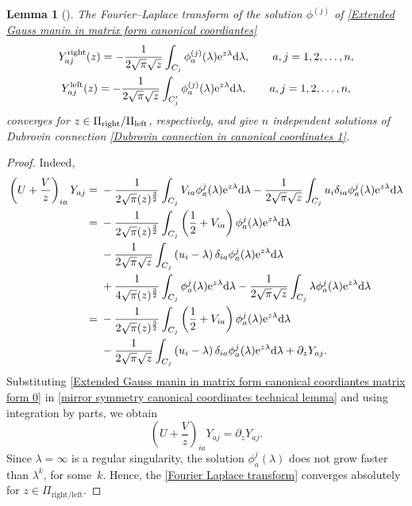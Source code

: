 \documentclass[11pt]{article}
\numberwithin{equation}{section}
\numberwithin{equation}{section}
\newtheorem{Lemma}[Theorem]{Lemma}
\begin{document}
 \begin{Lemma}[{\cite{B.Dubrovin3}}]\label{Main lemma Mirror symmetry 1}
 The Fourier--Laplace transform of the solution $\phi^{(j)}$ of \eqref{Extended Gauss manin in matrix form canonical coordiantes}
\begin{gather}
Y^{\rm right}_{aj}(z)=-\frac{1}{2\sqrt{\pi}\sqrt{z}}\int_{C_j}\phi_a^{(j)}(\lambda){\rm e}^{z\lambda}{\rm d}\lambda, \qquad a,j=1,2,\dots,n,\nonumber\\
Y^{\rm left}_{aj}(z)=-\frac{1}{2\sqrt{\pi}\sqrt{z}}\int_{C_j^{\prime}}\phi_a^{(j)}(\lambda){\rm e}^{z\lambda}{\rm d}\lambda, \qquad a,j=1,2,\dots,n,\label{Fourier Laplace transform}
\end{gather}
converges for $z \in \Pi_{\rm right}/\Pi_{\rm left}$, respectively, and give $n$ independent solutions of Dubrovin connection \eqref{Dubrovin connection in canonical coordinates 1}.
\end{Lemma}

\begin{proof}
 Indeed,
\begin{align}
\left(U+\frac{V}{z}\right)_{ia}Y_{aj}={}&-\frac{1}{2\sqrt{\pi}(z)^{\frac{3}{2}}}\int_{C_j}V_{ia}\phi_a^{j}(\lambda){\rm e}^{z\lambda}{\rm d}\lambda-\frac{1}{2\sqrt{\pi}\sqrt{z}}\int_{C_j}u_i\delta_{ia}\phi_a^{j}(\lambda){\rm e}^{z\lambda}{\rm d}\lambda\nonumber\\
={}&-\frac{1}{2\sqrt{\pi}(z)^{\frac{3}{2}}}\int_{C_j}\left(\frac{1}{2}+V_{ia}\right)\phi_a^{j}(\lambda){\rm e}^{z\lambda}{\rm d}\lambda\nonumber\\
&-\frac{1}{2\sqrt{\pi}\sqrt{z}}\int_{C_j}\left(u_i-\lambda\right)\delta_{ia}\phi_a^{j}(\lambda){\rm e}^{z\lambda}{\rm d}\lambda\nonumber\\
&+\frac{1}{4\sqrt{\pi}(z)^{\frac{3}{2}}}\int_{C_j}\phi_a^{j}(\lambda){\rm e}^{z\lambda}{\rm d}\lambda-\frac{1}{2\sqrt{\pi}\sqrt{z}}\int_{C_j}\lambda\phi_a^{j}(\lambda){\rm e}^{z\lambda}{\rm d}\lambda\nonumber\\
={}&-\frac{1}{2\sqrt{\pi}(z)^{\frac{3}{2}}}\int_{C_j}\left(\frac{1}{2}+V_{ia}\right)\phi_a^{j}(\lambda){\rm e}^{z\lambda}{\rm d}\lambda\nonumber\\
&-\frac{1}{2\sqrt{\pi}\sqrt{z}}\int_{C_j}\left(u_i-\lambda\right)\delta_{ia}\phi_a^{j}(\lambda){\rm e}^{z\lambda}{\rm d}\lambda+\partial_zY_{aj}.\label{mirror symmetry canonical coordinates technical lemma}
\end{align}
Substituting \eqref{Extended Gauss manin in matrix form canonical coordiantes matrix form 0} in \eqref{mirror symmetry canonical coordinates technical lemma} and using integration by parts, we obtain
\[
\left(U+\frac{V}{z}\right)_{ia}Y_{aj}=\partial_zY_{aj}.
\]
Since $\lambda=\infty$ is a regular singularity, the solution $\phi_a^{j}(\lambda)$ does not grow faster than $\lambda^k$, for some~$k$. Hence, the \eqref{Fourier Laplace transform} converges absolutely for $z \in \Pi_{\text{right/left}}$.
\end{proof}
\end{document}
